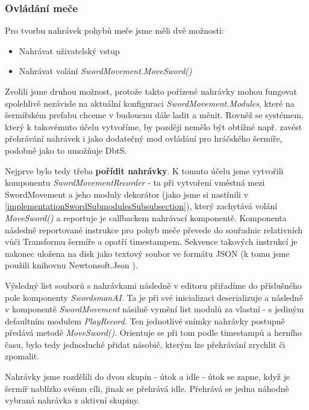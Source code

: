 \subsubsection*{Ovládání meče}

Pro tvorbu nahrávek pohybů meče jsme měli dvě možnosti:
\begin{itemize}
  \item Nahrávat uživatelský vstup
  \item Nahrávat volání \textit{SwordMovement.MoveSword()}
\end{itemize}

Zvolili jsme druhou možnost, protože takto pořízené nahrávky mohou fungovat spolehlivě nezávisle na aktuální konfiguraci \textit{SwordMovement.Modules}, které na šermířském prefabu chceme v budoucnu dále ladit a měnit. Rovněž se systémem, který k takovémuto účelu vytvoříme, by později nemělo být obtížné např. zavést přehrávání nahrávek i jako dodatečný mod ovládání pro hráčského šermíře, podobně jako to umožňuje \acl{DbtS}.

\bigbreak

Nejprve bylo tedy třeba \textbf{pořídit nahrávky}. K tomuto účelu jsme vytvořili komponentu \textit{SwordMovementRecorder} - ta při vytvoření vměstná mezi SwordMovement a jeho moduly dekorátor (jako jsme si nastínili v \ref{implementationSwordSubmodulesSubsubsection}), který zachytává volání \textit{MoveSword()} a reportuje je callbackem nahrávací komponentě. Komponenta následně reportované instrukce pro pohyb meče převede do souřadnic relativních vůči Transformu šermíře a opatří timestampem. Sekvence takových instrukcí je nakonec uložena na disk jako textový soubor ve formátu JSON (k tomu jsme použili knihovnu Newtonsoft.Json \cite{NewtonsoftJson}).

\bigbreak

Výsledný list souborů s nahrávkami následně v editoru přiřadíme do příslušného pole komponenty \textit{SwordsmanAI}. Ta je při své inicializaci deserializuje a následně v komponentě \textit{SwordMovement} násilně vymění list modulů za vlastní - s jediným defaultním modulem \textit{PlayRecord}. Ten jednotlivé snímky nahrávky postupně předává metodě \textit{MoveSword()}. Orientuje se při tom podle timestampů a herního času, bylo tedy jednoduché přidat násobič, kterým lze přehrávání zrychlit či zpomalit.

Nahrávky jsme rozdělili do dvou skupin - útok a idle - útok se zapne, když je šermíř nablízko svému cíli, jinak se přehrává idle. Přehrává se jedna náhodně vybraná nahrávka z aktivní skupiny.

